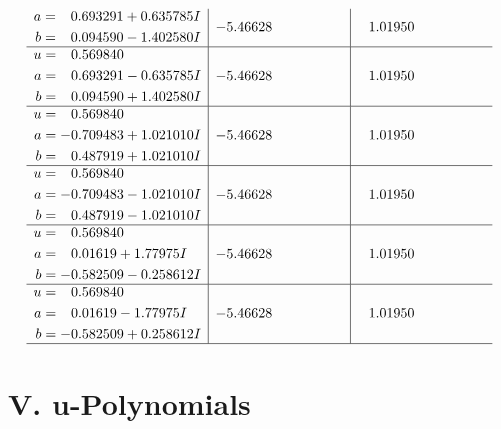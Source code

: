 \documentclass[1p]{elsarticle_modified}
\theoremstyle{definition}
\begin{document}
$$\begin{array}{c|c|c}
\begin{aligned}
a &= \phantom{-}0.693291 + 0.635785 I \\
b &= \phantom{-}0.094590 - 1.402580 I\end{aligned}
 & -5.46628\phantom{ +0.000000I} & \phantom{-}1.01950\phantom{ +0.000000I} \\ \hline\begin{aligned}
u &= \phantom{-}0.569840\phantom{ +0.000000I} \\
a &= \phantom{-}0.693291 - 0.635785 I \\
b &= \phantom{-}0.094590 + 1.402580 I\end{aligned}
 & -5.46628\phantom{ +0.000000I} & \phantom{-}1.01950\phantom{ +0.000000I} \\ \hline\begin{aligned}
u &= \phantom{-}0.569840\phantom{ +0.000000I} \\
a &= -0.709483 + 1.021010 I \\
b &= \phantom{-}0.487919 + 1.021010 I\end{aligned}
 & -5.46628\phantom{ +0.000000I} & \phantom{-}1.01950\phantom{ +0.000000I} \\ \hline\begin{aligned}
u &= \phantom{-}0.569840\phantom{ +0.000000I} \\
a &= -0.709483 - 1.021010 I \\
b &= \phantom{-}0.487919 - 1.021010 I\end{aligned}
 & -5.46628\phantom{ +0.000000I} & \phantom{-}1.01950\phantom{ +0.000000I} \\ \hline\begin{aligned}
u &= \phantom{-}0.569840\phantom{ +0.000000I} \\
a &= \phantom{-}0.01619 + 1.77975 I \\
b &= -0.582509 - 0.258612 I\end{aligned}
 & -5.46628\phantom{ +0.000000I} & \phantom{-}1.01950\phantom{ +0.000000I} \\ \hline\begin{aligned}
u &= \phantom{-}0.569840\phantom{ +0.000000I} \\
a &= \phantom{-}0.01619 - 1.77975 I \\
b &= -0.582509 + 0.258612 I\end{aligned}
 & -5.46628\phantom{ +0.000000I} & \phantom{-}1.01950\phantom{ +0.000000I}\\
 \hline 
 \end{array}$$\newpage
\newpage\renewcommand{\arraystretch}{1}
\centering \section*{ V. u-Polynomials}
\end{document}
